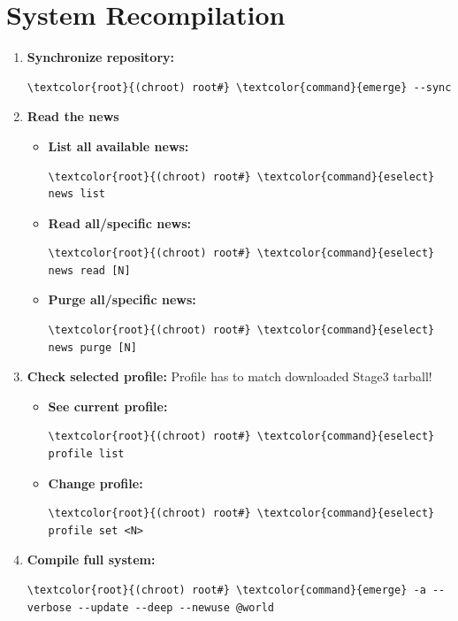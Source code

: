 \documentclass[10pt, a4paper, onecolumn, oneside, titlepage, openany]{book}
\begin{document}
\section{System Recompilation}
\begin{enumerate}
    \item \textbf{Synchronize repository:}
\begin{Verbatim}[commandchars=\\\{\}]
\textcolor{root}{(chroot) root#} \textcolor{command}{emerge} --sync
\end{Verbatim}
    \item \textbf{Read the news}
    \begin{itemize}
        \item \textbf{List all available news:}
\begin{Verbatim}[commandchars=\\\{\}]
\textcolor{root}{(chroot) root#} \textcolor{command}{eselect} news list
\end{Verbatim}
        \item \textbf{Read all/specific news:}
\begin{Verbatim}[commandchars=\\\{\}]
\textcolor{root}{(chroot) root#} \textcolor{command}{eselect} news read [N]
\end{Verbatim}
        \item \textbf{Purge all/specific news:}
\begin{Verbatim}[commandchars=\\\{\}]
\textcolor{root}{(chroot) root#} \textcolor{command}{eselect} news purge [N]
\end{Verbatim}
    \end{itemize}
    \item \textbf{Check selected profile:}
\newline Profile has to match downloaded Stage3 tarball!
    \begin{itemize}
        \item \textbf{See current profile:}
\begin{Verbatim}[commandchars=\\\{\}]
\textcolor{root}{(chroot) root#} \textcolor{command}{eselect} profile list
\end{Verbatim}
        \item \textbf{Change profile:}
\begin{Verbatim}[commandchars=\\\{\}]
\textcolor{root}{(chroot) root#} \textcolor{command}{eselect} profile set <N>
\end{Verbatim}
    \end{itemize}
    \item \textbf{Compile full system:}
\begin{Verbatim}[commandchars=\\\{\}]
\textcolor{root}{(chroot) root#} \textcolor{command}{emerge} -a --verbose --update --deep --newuse @world
\end{Verbatim}
\end{enumerate}
\end{document}
